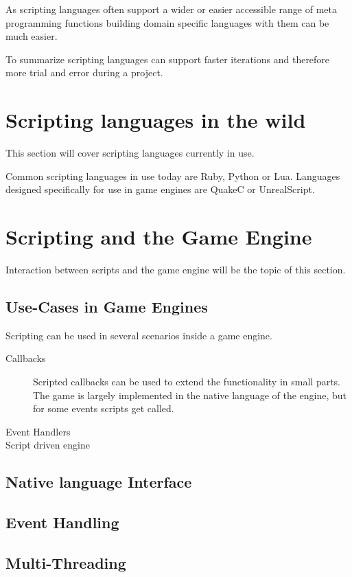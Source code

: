 \documentclass{article}
\begin{document}
As scripting languages often support a wider or easier accessible range of
meta programming functions building domain specific languages with them can be
much easier.

To summarize scripting languages can support faster iterations and
therefore more trial and error during a project.

\section{Scripting languages in the wild}
This section will cover scripting languages currently in use. 

Common scripting languages in use today are Ruby, Python or Lua. Languages
designed specifically for use in game engines are QuakeC or UnrealScript.

\section{Scripting and the Game Engine}
Interaction between scripts and the game engine will be the topic of this
section.
\subsection{Use-Cases in Game Engines}
Scripting can be used in several scenarios inside a game engine.

\begin{description}
\item[Callbacks] Scripted callbacks can be used to extend the functionality in
small parts. The game is largely implemented in the native language of the
engine, but for some events scripts get called.
\item[Event Handlers]
\item[Script driven engine]
\end{description}

\subsection{Native language Interface}

\subsection{Event Handling}

\subsection{Multi-Threading}
\end{document}
